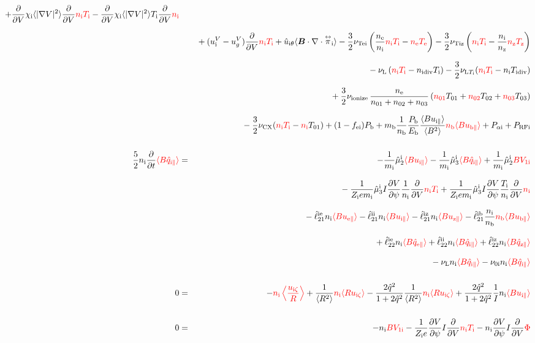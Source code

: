 \documentclass[11pt]{article}
\def\bvec#1{\leavevmode\hbox{\boldmath$#1$}}
\let\vec=\bvec
\def\r#1{{\rm#1}}
\def\ave#1{\left\langle#1\right\rangle}
\def\aves#1{\langle#1\rangle}
\def\dd#1#2{\frac{\partial #1}{\partial #2}}
\def\tensor#1{\mathord{\displaystyle\mathop{#1}^\leftrightarrow}}
\def\para{\parallel}
\def\ddV{\frac{\partial}{\partial V}}
\def\ddt{\frac{\partial}{\partial t}}
\def\mi{m_\r{i}}
\def\mb{m_\r{b}}
\def\nee{n_\r{e}}
\def\ni{n_\r{i}}
\def\nz{n_\r{z}}
\def\nb{n_\r{b}}
\def\Te{T_\r{e}}
\def\Ti{T_\r{i}}
\def\Tz{T_\r{z}}
\def\Zi{Z_\r{i}}
\def\uzt#1{u_{\r{#1}\zeta}}
\def\upara#1{u_{\r{#1}\para}}
\def\uhatth#1{\hat{u}_{\r{#1}\theta}}
\def\qhatpara#1{\hat{q}_{\r{#1}\para}}
\def\uV#1{u_\r{#1}^V}
\def\ugV{u_{g}^V}
\def\chis#1{\chi_\r{#1}}
\def\nun#1{\nu_\r{0#1}}
\def\ndiv#1{n_\r{#1div}}
\def\Tdiv#1{T_\r{#1div}}
\def\nuLT#1{\nu_{\r{L}T_\r{#1}}}
\def\PRF#1{P_\r{RF#1}}
\def\Palp#1{P_{\alpha\r{#1}}}
\def\fei{f_\r{ei}}
\def\Pb{P_\r{b}}
\def\Eb{E_\r{b}}
\def\nna{n_{01}}
\def\nnb{n_{02}}
\def\nnc{n_{03}}
\def\Tna{T_{01}}
\def\Tnb{T_{02}}
\def\Tnc{T_{03}}
\def\nuL{\nu_\r{L}}
\def\nuCX{\nu_\r{CX}}
\def\nuion{\nu_\r{ionize}}
\def\red#1{\textcolor{red}{#1}}
\begin{document}
\begin{eqnarray}
  + \ddV \chis{i} \aves{|\nabla V|^2} \ddV \red{\ni \Ti}
  - \ddV \chis{i} \aves{|\nabla V|^2} \Ti \ddV \red{\ni}
\nonumber\\[2.5mm]&&{}
%
  + ( \uV{i} - \ugV ) \ddV \red{\ni \Ti}
%
  + \uhatth{i} \aves{\vec{B}\cdot\nabla\cdot\tensor{\pi}_\r{i}}
%
  - \frac{3}{2} \nu_\r{Tei} \left(\frac{\nee}{\ni} \red{\ni \Ti} - \red{\nee \Te} \right)
  - \frac{3}{2} \nu_\r{Tiz} \left(\red{\ni \Ti} - \frac{\ni}{\nz}\red{\nz  \Tz} \right)
\nonumber\\[2.5mm]&&{}
%
  - \nuL \left(\red{\ni \Ti}  - \ndiv{i} \Ti \right)
%
  - \frac{3}{2} \nuLT{i} (\red{\ni \Ti} - \ni \Tdiv{i})
%
\nonumber\\[2.5mm]&&{}
  + \frac{3}{2} \nuion\, \frac{\nee}{\nna + \nnb + \nnc}\, (\red{\nna} \Tna +
  \red{\nnb} \Tnb + \red{\nnc} \Tnc)
\nonumber\\[2.5mm]&&{}
%
  - \frac{3}{2} \nuCX (\red{\ni \Ti} - \red{\ni} \Tna)
%
  + (1 - \fei) \Pb
%
  + \mb \frac{1}{\nb} \frac{\Pb}{\Eb} \frac{\aves{B
  \upara{i}}}{\aves{B^2}} \red{\nb \aves{B \upara{b}}}
%
  + \Palp{i}
%
  + \PRF{i}
\\[5mm]
 \frac{5}{2} \ni \ddt \red{\aves{B \qhatpara{i}}} &=&
%
  - \frac{1}{\mi} \hat{\mu}_2^\r{i} \red{\aves{B \upara{i}}}
  - \frac{1}{\mi} \hat{\mu}_3^\r{i} \red{\aves{B \qhatpara{i}}}
%
  + \frac{1}{\mi} \hat{\mu}_2^\r{i} \red{B V_{1\r{i}}} 
\nonumber\\[3mm]&&{}
%
  - \frac{1}{\Zi e\mi} \hat{\mu}_3^\r{i} I \dd{V}{\psi} \frac{1}{\ni}
  \ddV \red{\ni\Ti}
  + \frac{1}{\Zi e\mi} \hat{\mu}_3^\r{i} I \dd{V}{\psi} \frac{\Ti}{\ni}
  \ddV \red{\ni}
\nonumber\\[3mm]&&{}
%
  - \hat{\ell}_{21}^{\r{ie}} \ni \red{\aves{B \upara{e}}} 
  - \hat{\ell}_{21}^{\r{ii}} \ni \red{\aves{B \upara{i}}} 
  - \hat{\ell}_{21}^{\r{iz}} \ni \red{\aves{B \upara{z}}} 
  - \hat{\ell}_{21}^{\r{ib}} \frac{\ni}{\nb} \red{\nb \aves{B \upara{b}}} 
\nonumber\\[3mm]&&{}
%
  + \hat{\ell}_{22}^{\r{ie}} \ni \red{\aves{B \qhatpara{e}}} 
  + \hat{\ell}_{22}^{\r{ii}} \ni \red{\aves{B \qhatpara{i}}} 
  + \hat{\ell}_{22}^{\r{iz}} \ni \red{\aves{B \qhatpara{z}}} 
\nonumber\\[3mm]&&{}
%
  - \nuL \ni \red{\aves{B \qhatpara{i}}}
%
  - \nun{i} \ni \red{\aves{B \qhatpara{i}}}
\\[5mm]
  0 &=&
%
  - \red{\ni \ave{\frac{\uzt{i}}{R}}}
%
  + \frac{1}{\aves{R^2}} \red{\ni \aves{R\uzt{i}}}
%
  - \frac{2\hat{q}^2}{1+2\hat{q}^2} \frac{1}{\aves{R^2}}\red{\ni\aves{R\uzt{i}}}
%
  + \frac{2\hat{q}^2}{1+2\hat{q}^2} \frac{1}{I}\ni \red{\aves{B\upara{i}}}
\\[5mm]
    0 &=&
%
  - \ni \red{BV_{1\r{i}}}
%
  - \frac{1}{\Zi e} \dd{V}{\psi} I \ddV \red{\ni\Ti}
%
  - \ni \dd{V}{\psi} I \ddV \red{\Phi}
\end{eqnarray}
%
\end{document}
